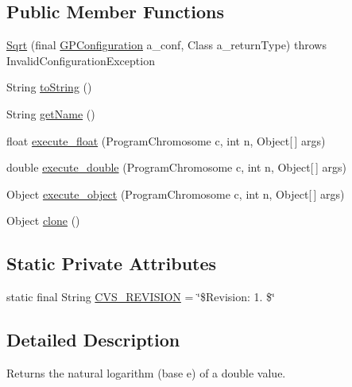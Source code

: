 \subsection*{Public Member Functions}
\begin{DoxyCompactItemize}
\item 
\hyperlink{classexamples_1_1gp_1_1symbolic_regression_1_1_sqrt_aae2726c6fbb45d36734afd90ad398177}{Sqrt} (final \hyperlink{classorg_1_1jgap_1_1gp_1_1impl_1_1_g_p_configuration}{G\-P\-Configuration} a\-\_\-conf, Class a\-\_\-return\-Type)  throws Invalid\-Configuration\-Exception 
\item 
String \hyperlink{classexamples_1_1gp_1_1symbolic_regression_1_1_sqrt_a9168ee41c4379e0829d90098973eaab4}{to\-String} ()
\item 
String \hyperlink{classexamples_1_1gp_1_1symbolic_regression_1_1_sqrt_af59aa15c11ef13267da33d3afba87d36}{get\-Name} ()
\item 
float \hyperlink{classexamples_1_1gp_1_1symbolic_regression_1_1_sqrt_acea6bd80466b37fbc77c1caef9840274}{execute\-\_\-float} (Program\-Chromosome c, int n, Object\mbox{[}$\,$\mbox{]} args)
\item 
double \hyperlink{classexamples_1_1gp_1_1symbolic_regression_1_1_sqrt_a4ebe7f985a767834d7473c986e897528}{execute\-\_\-double} (Program\-Chromosome c, int n, Object\mbox{[}$\,$\mbox{]} args)
\item 
Object \hyperlink{classexamples_1_1gp_1_1symbolic_regression_1_1_sqrt_afc7e19e487b6e0f4610b0333ac89e7fb}{execute\-\_\-object} (Program\-Chromosome c, int n, Object\mbox{[}$\,$\mbox{]} args)
\item 
Object \hyperlink{classexamples_1_1gp_1_1symbolic_regression_1_1_sqrt_aa1f406143ad2049f1594eb04145f57ad}{clone} ()
\end{DoxyCompactItemize}
\subsection*{Static Private Attributes}
\begin{DoxyCompactItemize}
\item 
static final String \hyperlink{classexamples_1_1gp_1_1symbolic_regression_1_1_sqrt_a04c1016ca939501ebc37c72d608ea008}{C\-V\-S\-\_\-\-R\-E\-V\-I\-S\-I\-O\-N} = \char`\"{}\$Revision\-: 1. \$\char`\"{}
\end{DoxyCompactItemize}


\subsection{Detailed Description}
Returns the natural logarithm (base e) of a double value.

